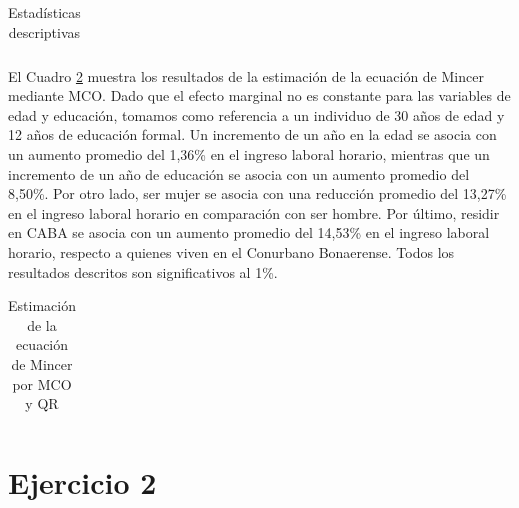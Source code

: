 \documentclass[12pt]{article}
\begin{document}
\begin{table}[H]
    \centering
    \caption[Estadísticas descriptivas]{Estadísticas descriptivas}
    \label{tab:sum_stats}
    \begin{adjustbox}{max width=\textwidth}
        \begin{tabular}{l*{2}{c}}
            
        \end{tabular}
    \end{adjustbox}
\end{table}

El Cuadro \ref{tab:OLS_mincer} muestra los resultados de la estimación de la ecuación de Mincer mediante MCO. Dado que el efecto marginal no es constante para las variables de edad y educación, tomamos como referencia a un individuo de 30 años de edad y 12 años de educación formal. Un incremento de un año en la edad se asocia con un aumento promedio del 1,36\% en el ingreso laboral horario, mientras que un incremento de un año de educación se asocia con un aumento promedio del 8,50\%. Por otro lado, ser mujer se asocia con una reducción promedio del 13,27\% en el ingreso laboral horario en comparación con ser hombre. Por último, residir en CABA se asocia con un aumento promedio del 14,53\% en el ingreso laboral horario, respecto a quienes viven en el Conurbano Bonaerense. Todos los resultados descritos son significativos al 1\%.
\begin{table}[H]
    \centering
    \caption[Estimación de la ecuación de Mincer por MCO y QR]{Estimación de la ecuación de Mincer por MCO y QR}
    \label{tab:OLS_mincer}
    \begin{adjustbox}{max width=0.8\textwidth}
        \begin{tabular}{l*{2}{c}}
            
        \end{tabular}
    \end{adjustbox}
\end{table}


\section*{Ejercicio 2}
\end{document}
